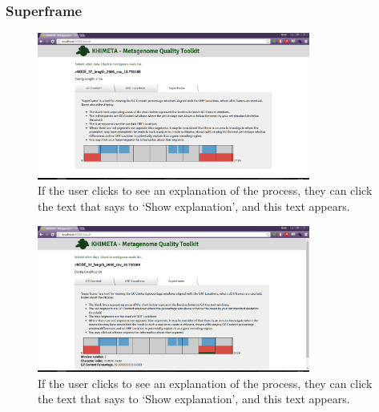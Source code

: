 \subsubsection{Superframe}


\begin{figure}[H]
	\centering
\includegraphics[width=0.8\textwidth]{images/ui8}
\caption{If the user clicks to see an explanation of the process, they can click the text that says to `Show explanation', and this text appears.}
\end{figure}
\begin{figure}[H]
	\centering
\includegraphics[width=0.8\textwidth]{images/ui9}
\caption{If the user clicks to see an explanation of the process, they can click the text that says to `Show explanation', and this text appears.}
\end{figure}

